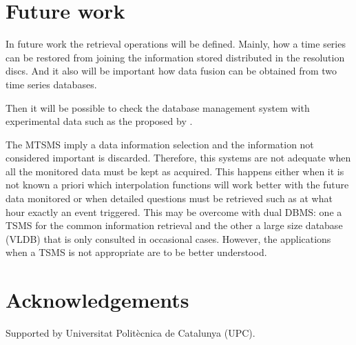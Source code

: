 \section{Future work}\label{sec:future}

In future work the retrieval operations will be defined. Mainly, how a
time series can be restored from joining the information stored
distributed in the resolution discs. And it also will be important
how data fusion can be obtained from two time series databases.

Then it will be possible to check the database management system with
experimental data such as the proposed by \cite{keogh02}.

The MTSMS imply a data information selection and the information not considered important is discarded.  Therefore, this systems are not adequate when all the monitored data must be kept as acquired. This happens either when it is not known a priori which interpolation functions will work better with the future data monitored or when detailed questions must be retrieved such as at what hour exactly an event triggered. This may be overcome with dual DBMS: one a TSMS for the common information retrieval and the other a large size database (VLDB) that is only consulted in occasional cases. 
However, the applications when a TSMS is not appropriate are to be better understood. 

          
\section{Acknowledgements}

Supported by Universitat Politècnica de Catalunya (UPC).

